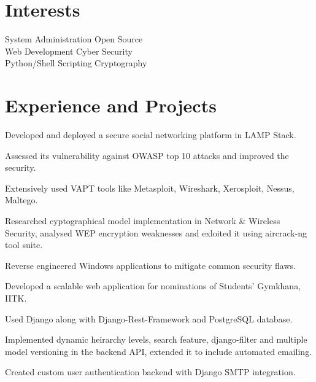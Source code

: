 \documentclass[]{deedy-resume-openfont}
\begin{document}
\begin{minipage}[t]{0.30\textwidth}
\section{Interests}
System Administration \textbullet{}Open Source \\
Web Development \textbullet{} Cyber Security \\
Python/Shell Scripting  \textbullet{} Cryptography \\

%
%

\end{minipage} 
\hfill
\begin{minipage}[t]{0.70\textwidth} 

\vspace{-0.7cm}
\section{Experience and Projects}
\vspace{\topsep} %
\begin{tightemize}
  \item Developed and deployed a secure social networking platform in LAMP Stack. 
  \item Assessed its vulnerability against OWASP top 10 attacks and improved the security.
  \item Extensively used VAPT tools like Metasploit, Wireshark, Xerosploit, Nessus, Maltego.
  \item	Researched cyptographical model implementation in Network \& Wireless Security, analysed WEP encryption weaknesses and exloited it using aircrack-ng tool suite.
  \item Reverse engineered Windows applications to mitigate common security flaws.
\end{tightemize}


\vspace{0cm} %
\begin{tightemize}
  \item Developed a scalable web application for nominations of Students' Gymkhana, IITK.
  \item Used Django along with Django-Rest-Framework and PostgreSQL database.
  \item	Implemented dynamic heirarchy levels, search feature, django-filter and multiple model versioning in the backend API, extended it to include automated emailing. \\
  \item Created custom user authentication backend with Django SMTP integration.
\end{tightemize}


\end{minipage}
\end{document}
